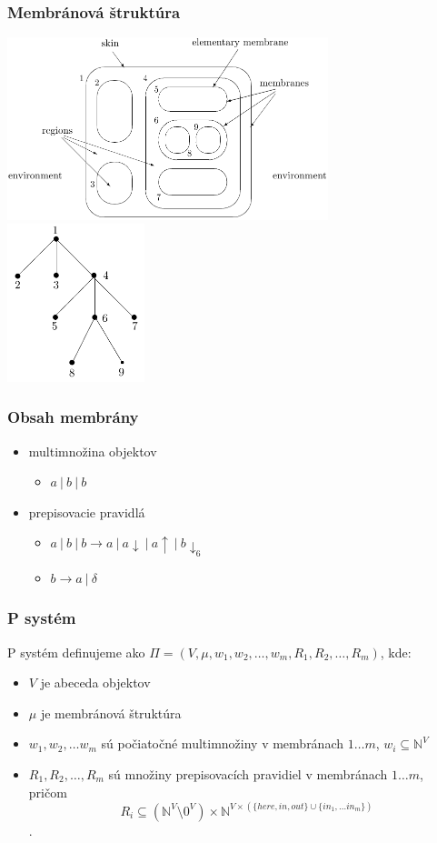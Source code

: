 \documentclass{beamer}
\begin{document}
\begin{frame}[t]\frametitle{Membránová štruktúra}
\includegraphics[width=0.7\textwidth]{membrane_structure.png}
\hfill
\includegraphics[width=0.3\textwidth]{membrane_tree.png}
\end{frame}

\begin{frame}[t]\frametitle{Obsah membrány}
\begin{itemize}
  \item multimnožina objektov
  \begin{itemize}
    \item $a\ |\ b\ |\ b$
  \end{itemize}
  \item prepisovacie pravidlá
  \begin{itemize}
    \item $a\ |\ b\ |\ b\rightarrow a\ |\ a\downarrow\ |\ a\uparrow\ |\ b\downarrow_6$
    \item $b \rightarrow a\ |\ \delta$
  \end{itemize}
\end{itemize}
\end{frame}

\begin{frame}[t]\frametitle{P systém}

P systém definujeme ako $\Pi = (V, \mu, w_1, w_2,\dots , w_m, R_1, R_2, \dots , R_m)$, kde:
\begin{itemize}
  \item $V$ je abeceda objektov
  \item $\mu$ je membránová štruktúra
  \item $w_1, w_2, \dots w_m$ sú počiatočné multimnožiny v membránach $1\dots m$, $w_i\subseteq \mathbb{N}^V$
  \item $R_1, R_2, \dots , R_m$ sú množiny prepisovacích pravidiel v membránach $1\dots m$, pričom $$R_i\subseteq(\mathbb{N}^V\setminus 0^V)\times\mathbb{N}^{V\times(\{here,in,out\}\cup\{in_1,\dots in_m\})}$$.
\end{itemize}

\end{frame}
\end{document}
